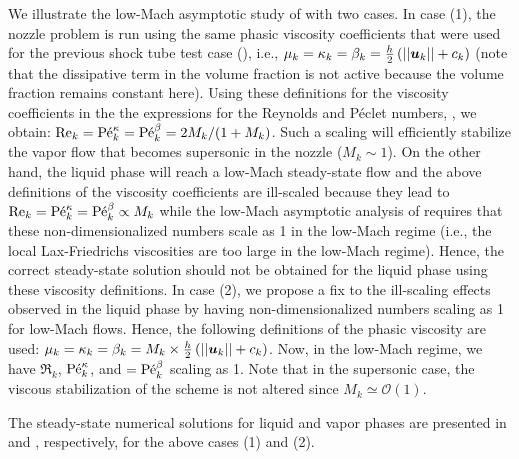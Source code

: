 %
We illustrate the low-Mach asymptotic study of  with two cases. 
%
In case (1), the nozzle problem is run using the same phasic viscosity 
coefficients that were used for the previous shock tube test case (), i.e., 
$\mu_k =  \kappa_k = \beta_k = \tfrac{h}{2} \left( ||\boldsymbol u_k|| + c_k \right)$ 
(note that the dissipative term in the volume fraction is not active because the volume fraction remains constant here). 
Using these definitions for the viscosity coefficients in the the expressions for the Reynolds and P\'eclet numbers, , 
we obtain: $\textrm{Re}_k=\textrm{P\'e}_k^\kappa=\textrm{P\'e}_k^\beta = 2M_k / (1+M_k)$. 
Such a scaling will efficiently stabilize the vapor flow that becomes supersonic in the nozzle ($M_k \sim 1 $). On the other hand, the liquid phase will reach 
a low-Mach steady-state flow and the above definitions of the viscosity coefficients are ill-scaled because they lead to $\textrm{Re}_k=\textrm{P\'e}_k^\kappa=\textrm{P\'e}_k^\beta \propto M_k$ 
while the low-Mach asymptotic analysis of  requires that these non-dimensionalized numbers scale as 1 in the low-Mach regime (i.e., the local Lax-Friedrichs viscosities are too large in the low-Mach regime). Hence, the correct steady-state solution
should not be obtained for the liquid phase using these viscosity definitions. 
%
In case (2), we propose a fix to the ill-scaling effects observed in the liquid phase by having non-dimensionalized numbers scaling as 1
for low-Mach flows. Hence, the following definitions of the phasic viscosity are used:  $\mu_k =  \kappa_k = \beta_k = M_k \times \tfrac{h}{2} \left( ||\boldsymbol u_k|| + c_k \right)$. 
Now, in the low-Mach regime, we have $\Re_k$, $\textrm{P\'e}_k^\kappa$, and $=\textrm{P\'e}_k^\beta$ scaling as 1. Note that in the supersonic case, the 
viscous stabilization of the scheme is not altered since $M_k \simeq \mathcal{O}(1)$. 

The steady-state numerical solutions for liquid and vapor phases are presented in  and , respectively, 
for the above cases (1) and (2). 


